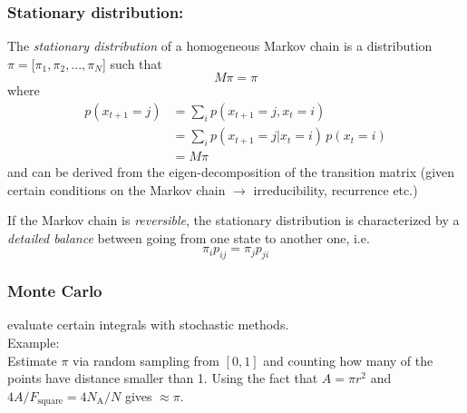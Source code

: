 \begin{frame}\frametitle{Stationary distribution:}
\label{sec:stat-distr}
The \emph{stationary distribution} of a homogeneous Markov chain is a
distribution $\pi=[\pi_1,\pi_2,..., \pi_N$] such that
\begin{equation}
M \pi  = \pi
\end{equation}
where 
\begin{align}
p(x_{t+1}=j) &= \sum_i p(x_{t+1}=j,x_{t}=i) \\
&= \sum_i p(x_{t+1}=j|x_{t}=i)\,p(x_{t}=i)\\
&= M \pi
\end{align}
and can be derived from the eigen-decomposition of the transition matrix
(given certain conditions on the Markov chain $\rightarrow$ irreducibility, recurrence etc.)

If the Markov chain is \emph{reversible}, the stationary distribution is
characterized by a \emph{detailed balance} between going from one
state to another one, i.e.\
$$
\pi_i p_{ij} = \pi_j p_{ji}
$$
\end{frame}

\begin{frame}\frametitle{Monte Carlo}
 evaluate certain integrals with stochastic methods.\\

Example:\\
Estimate $\pi$ via random sampling from $[0,1]$ and counting how
many of the points have distance smaller than 1. Using the fact that
$A = \pi r^2$ and $4 A/F_\mathrm{square} = 4 N_\mathrm{A}/N$ gives $\approx \pi$.
\\
\end{frame}

\begin{frame}
\end{frame}

